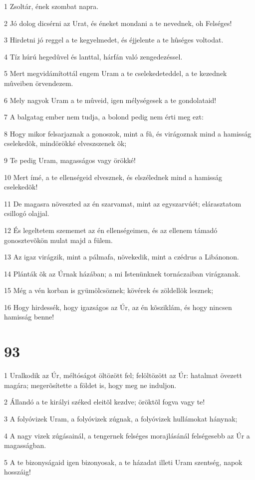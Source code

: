 \par 1 Zsoltár, ének szombat napra.
\par 2 Jó dolog dicsérni az Urat, és éneket mondani a te nevednek, oh Felséges!
\par 3 Hirdetni jó reggel a te kegyelmedet, és éjjelente a te hûséges voltodat.
\par 4 Tíz húrú hegedûvel és lanttal, hárfán való zengedezéssel.
\par 5 Mert megvidámítottál engem Uram a te cselekedeteddel, a te kezednek mûveiben örvendezem.
\par 6 Mely nagyok Uram a te mûveid, igen mélységesek a te gondolataid!
\par 7 A balgatag ember nem tudja, a bolond pedig nem érti meg ezt:
\par 8 Hogy mikor felsarjaznak a gonoszok, mint a fû, és virágoznak mind a hamisság cselekedõk, mindörökké elveszszenek õk;
\par 9 Te pedig Uram, magasságos vagy örökké!
\par 10 Mert ímé, a te ellenségeid elvesznek, és elszélednek mind a hamisság cselekedõk!
\par 11 De magasra növeszted az én szarvamat, mint az egyszarvúét; elárasztatom csillogó olajjal.
\par 12 És legeltetem szememet az én ellenségeimen, és az ellenem támadó gonosztevõkön mulat majd a fülem.
\par 13 Az igaz virágzik, mint a pálmafa, növekedik, mint a czédrus a Libánonon.
\par 14 Plánták õk az Úrnak házában; a mi Istenünknek tornáczaiban virágzanak.
\par 15 Még a vén korban is gyümölcsöznek; kövérek és zöldellõk lesznek;
\par 16 Hogy hirdessék, hogy igazságos az Úr, az én kõsziklám, és hogy nincsen hamisság benne!

\chapter{93}

\par 1 Uralkodik az Úr, méltóságot öltözött fel; felöltözött az Úr: hatalmat övezett magára; megerõsítette a földet is, hogy meg ne induljon.
\par 2 Állandó a te királyi széked eleitõl kezdve; öröktõl fogva vagy te!
\par 3 A folyóvizek Uram, a folyóvizek zúgnak, a folyóvizek hullámokat hánynak;
\par 4 A nagy vizek zúgásainál, a tengernek felséges morajlásánál felségesebb az Úr a magasságban.
\par 5 A te bizonyságaid igen bizonyosak, a te házadat illeti Uram szentség, napok hosszáig!

